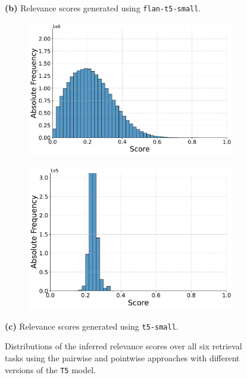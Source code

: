 \begin{figure}[t!]
    \vspace{-0.5cm}
    \textbf{(b)} Relevance scores generated using \texttt{flan-t5-small}.
    \vspace{0.5cm}

    \begin{subfigure}[b]{0.49\textwidth}
        \centering
        \includegraphics[width=\textwidth]{graphics/seaborn/pairwise_self_score_distribution_t5-small.pdf}
        \label{fig:pairwise_t5-small}
    \end{subfigure}
    \hfill
    \begin{subfigure}[b]{0.49\textwidth}
        \centering
        \includegraphics[width=\textwidth]{graphics/seaborn/pointwise_self_score_distribution_t5-small.pdf}
        \label{fig:pointwise_t5-small}
    \end{subfigure}

    \vspace{-0.5cm}
    \textbf{(c)} Relevance scores generated using \texttt{t5-small}.
    \vspace{0.5cm}

    \caption{Distributions of the inferred relevance scores over all six retrieval tasks using the pairwise and pointwise approaches with different versions of the \texttt{T5} model.}
    \label{fig:score-distributions}
\end{figure}
